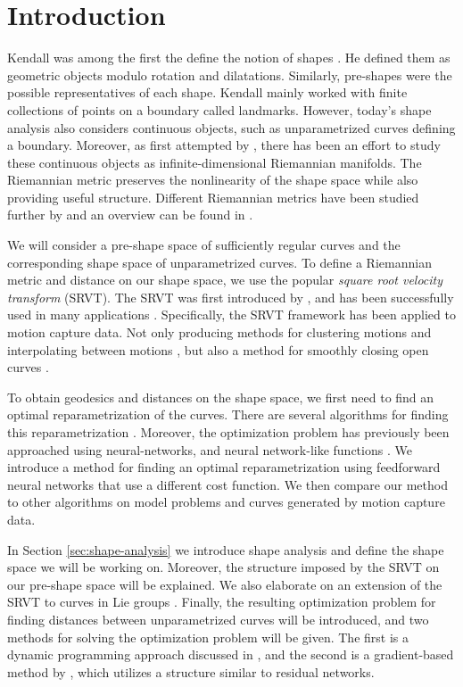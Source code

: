 \section{Introduction}
Kendall was among the first the define the notion of shapes \cite{kendall_1984_fistshape}. He defined them as geometric objects modulo rotation and dilatations. Similarly, pre-shapes were the possible representatives of each shape. Kendall mainly worked with finite collections of points on a boundary called landmarks. However, today's shape analysis also considers continuous objects, such as unparametrized curves defining a boundary. Moreover, as first attempted by \cite{younes_2000_manifold_start}, there has been an effort to study these continuous objects as infinite-dimensional Riemannian manifolds. The Riemannian metric preserves the nonlinearity of the shape space while also providing useful structure. Different Riemannian metrics have been studied further by \cite{michor2003vanishingl2,mio2007} and an overview can be found in \cite{bauer2014overview}.

We will consider a pre-shape space of sufficiently regular curves and the corresponding shape space of unparametrized curves. To define a Riemannian metric and distance on our shape space, we use the popular \emph{square root velocity transform} (SRVT). The SRVT was first introduced by \citeauthor{srivastava2011_srvt} \cite{srivastava2011_srvt}, and has been successfully used in many applications \cite{kurtek2013_a1,joshi2013_a2,laga2014_a3,kurtek2014_a4,laborde2013_a5}. Specifically, the SRVT framework has been applied to motion capture data. Not only producing methods for clustering motions and interpolating between motions \cite{eslitzbichler2014_motion}, but also a method for smoothly closing open curves \cite{celledoni2016}.

To obtain geodesics and distances on the shape space, we first need to find an optimal reparametrization of the curves. There are several algorithms for finding this reparametrization \cite{srivastava2011_srvt,su20017,kima2003_dp,bauer2017dp}. Moreover, the optimization problem has previously been approached using neural-networks\cite{berland2019}, and neural network-like functions \cite{jørgen2021}. We introduce a method for finding an optimal reparametrization using feedforward neural networks that use a different cost function. We then compare our method to other algorithms on model problems and curves generated by motion capture data.

In Section \ref{sec:shape-analysis} we introduce shape analysis and define the shape space we will be working on. Moreover, the structure imposed by the SRVT on our pre-shape space will be explained. We also elaborate on an extension of the SRVT to curves in Lie groups \cite{celledoni2016}. Finally, the resulting optimization problem for finding distances between unparametrized curves will be introduced, and two methods for solving the optimization problem will be given. The first is a dynamic programming approach discussed in \cite{bauer2017dp}, and the second is a gradient-based method by \citeauthor{jørgen2021} \cite{jørgen2021}, which utilizes a structure similar to residual networks.

